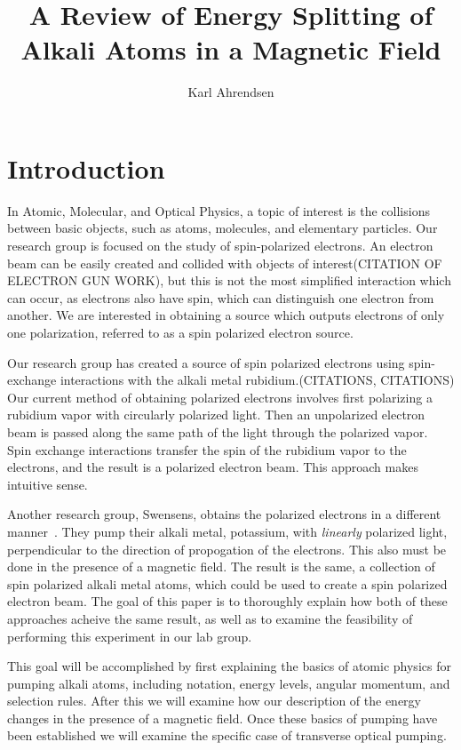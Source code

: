 \documentclass[letter,12pt]{article}
\begin{document}
\title{A Review of Energy Splitting of Alkali Atoms in a Magnetic Field}
\author{Karl Ahrendsen}
\maketitle{}

\section{Introduction}
In Atomic, Molecular,
and Optical Physics, a topic of interest is the collisions between
basic 
objects, such as atoms, molecules, and elementary particles.
Our research group is focused on the study of spin-polarized electrons. 
An electron beam can be easily created and collided
with objects of interest(CITATION OF ELECTRON GUN WORK),
but this is not the most simplified interaction
which can occur, as electrons also have spin, which can distinguish one 
electron from another. We are interested in obtaining a source which
outputs electrons of only one polarization, referred to as a spin
polarized electron source.

Our research group has created a source of spin polarized
electrons using spin-exchange interactions with the alkali metal
rubidium.(CITATIONS, CITATIONS)  Our current method of obtaining 
polarized electrons involves first polarizing a rubidium vapor
with circularly polarized light. Then an unpolarized electron beam
is passed along the same path of the light 
through the polarized vapor. Spin exchange interactions
transfer the spin of the rubidium vapor to the electrons, and the 
result is a polarized electron beam. This approach makes intuitive
sense.

Another research group, Swensens, obtains the polarized electrons
in a different manner~\cite{swenson}. They pump their alkali metal, 
potassium, with
\emph{linearly} polarized light, perpendicular to the direction
of propogation of the electrons. This also must be done in the
presence of a magnetic field. The result is the same, a collection
of spin polarized alkali metal atoms, which could be used to create
a spin polarized electron beam. The goal of this paper is to thoroughly
explain how both of these approaches acheive the same result, as well 
as to examine the feasibility of performing this experiment in our
lab group.

This goal will  be accomplished by first explaining the basics 
of atomic physics for pumping alkali atoms, including notation, energy
levels, angular momentum, and selection rules. After this we
will examine how our description of the energy changes in the
presence of a magnetic
field. Once these basics of pumping have been established we will
examine the specific case of transverse optical pumping. 
\end{document}
